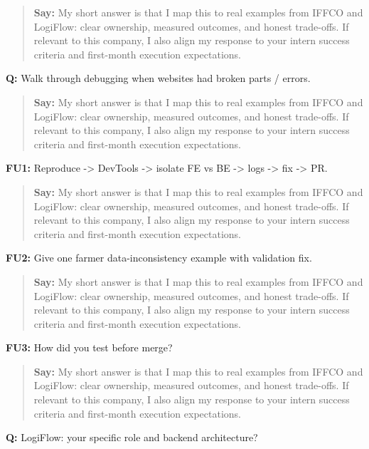 \documentclass[9pt,a4paper]{article}
\begin{document}
\begin{quote}\small\textbf{Say:} My short answer is that I map this to real examples from IFFCO and LogiFlow: clear ownership, measured outcomes, and honest trade-offs. If relevant to this company, I also align my response to your intern success criteria and first-month execution expectations.\end{quote}
\vspace{2mm}
\textbf{Q:} Walk through debugging when websites had broken parts / errors.

\begin{quote}\small\textbf{Say:} My short answer is that I map this to real examples from IFFCO and LogiFlow: clear ownership, measured outcomes, and honest trade-offs. If relevant to this company, I also align my response to your intern success criteria and first-month execution expectations.\end{quote}
\vspace{2mm}
\textbf{FU1:} Reproduce -> DevTools -> isolate FE vs BE -> logs -> fix -> PR.

\begin{quote}\small\textbf{Say:} My short answer is that I map this to real examples from IFFCO and LogiFlow: clear ownership, measured outcomes, and honest trade-offs. If relevant to this company, I also align my response to your intern success criteria and first-month execution expectations.\end{quote}
\vspace{2mm}
\textbf{FU2:} Give one farmer data-inconsistency example with validation fix.

\begin{quote}\small\textbf{Say:} My short answer is that I map this to real examples from IFFCO and LogiFlow: clear ownership, measured outcomes, and honest trade-offs. If relevant to this company, I also align my response to your intern success criteria and first-month execution expectations.\end{quote}
\vspace{2mm}
\textbf{FU3:} How did you test before merge?

\begin{quote}\small\textbf{Say:} My short answer is that I map this to real examples from IFFCO and LogiFlow: clear ownership, measured outcomes, and honest trade-offs. If relevant to this company, I also align my response to your intern success criteria and first-month execution expectations.\end{quote}
\vspace{2mm}
\textbf{Q:} LogiFlow: your specific role and backend architecture?
\end{document}
